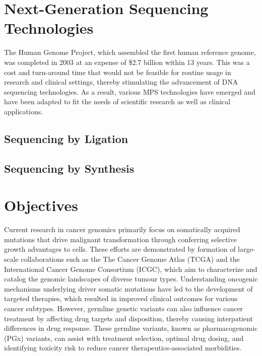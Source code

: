 \section{Next-Generation Sequencing Technologies}
\label{sec:Next-GenerationSequencingTechnologies}

The Human Genome Project, which assembled the first human reference genome, was completed in 2003 at an expense of \$2.7 billion within 13 years. This was a cost and turn-around time that would not be feasible for routine usage in research and clinical settings, thereby stimulating the advancement of DNA sequencing technologies. As a result, various MPS technologies have emerged and have been adapted to fit the needs of scientific research as well as clinical applications.

\subsection{Sequencing by Ligation}

\subsection{Sequencing by Synthesis}


\section{Objectives}
\label{sec:Objectives}

Current research in cancer genomics primarily focus on somatically acquired mutations that drive malignant transformation through conferring selective growth advantages to cells. These efforts are demonstrated by formation of large-scale collaborations such as the The Cancer Genome Atlas (TCGA) and the International Cancer Genome Consortium (ICGC), which aim to characterize and catalog the genomic landscapes of diverse tumour types. Understanding oncogenic mechanisms underlying driver somatic mutations have led to the development of targeted therapies, which resulted in improved clinical outcomes for various cancer subtypes. However, germline genetic variants can also influence cancer treatment by affecting drug targets and disposition, thereby causing interpatient differences in drug response. These germline variants, known as pharmacogenomic (PGx) variants, can assist with treatment selection, optimal drug dosing, and identifying toxicity risk to reduce cancer therapeutics-associated morbidities.

